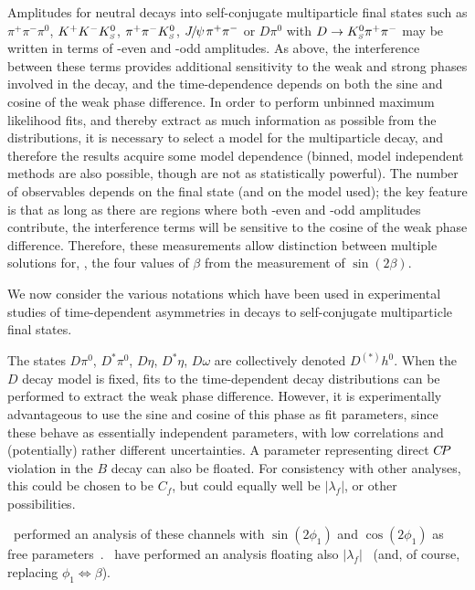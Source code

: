 Amplitudes for neutral \B decays into 
self-conjugate multiparticle final states
such as $\pi^+\pi^-\pi^0$, $K^+K^-K^0_{\scriptscriptstyle S}$, $\pi^+\pi^-K^0_{\scriptscriptstyle S}$,
${J\mskip -3mu/\mskip -2mu\psi\mskip 2mu} \pi^+\pi^-$ or $D\pi^0$ with $D \to K^0_{\scriptscriptstyle S}\pi^+\pi^-$
may be written in terms of \CP-even and \CP-odd amplitudes.
As above, the interference between these terms 
provides additional sensitivity to the weak and strong phases
involved in the decay,
and the time-dependence depends on both the sine and cosine
of the weak phase difference.
In order to perform unbinned maximum likelihood fits,
and thereby extract as much information as possible from the distributions,
it is necessary to select a model for the multiparticle decay,
and therefore the results acquire some model dependence
(binned, model independent methods are also possible,
though are not as statistically powerful).
The number of observables depends on the final state (and on the model used);
the key feature is that as long as there are regions where both
\CP-even and \CP-odd amplitudes contribute,
the interference terms will be sensitive to the cosine 
of the weak phase difference.
Therefore, these measurements allow distinction between multiple solutions
for, \eg, the four values of $\beta$ from the measurement of $\sin(2\beta)$.

We now consider the various notations which have been used 
in experimental studies of
time-dependent asymmetries in decays to self-conjugate multiparticle final states.

\label{sec:cp_uta:notations:dalitz:dh0}

The states $D\pi^0$, $D^*\pi^0$, $D\eta$, $D^*\eta$, $D\omega$
are collectively denoted $D^{(*)}h^0$.
When the $D$ decay model is fixed,
fits to the time-dependent decay distributions can be performed
to extract the weak phase difference.
However, it is experimentally advantageous to use the sine and cosine of 
this phase as fit parameters, since these behave as essentially 
independent parameters, with low correlations and (potentially)
rather different uncertainties.
A parameter representing direct $C\!P$ violation in the $B$ decay 
can also be floated.  
For consistency with other analyses, this could be chosen to be $C_f$,
but could equally well be $\left| \lambda_f \right|$, or other possibilities.

\belle\ performed an analysis of these channels
with $\sin(2\phi_1)$ and $\cos(2\phi_1)$ as free parameters~\cite{Krokovny:2006sv}.
\babar\ have performed an analysis floating also $\left| \lambda_f \right|$~\cite{Aubert:2007rp}
(and, of course, replacing $\phi_1 \Leftrightarrow \beta$).

